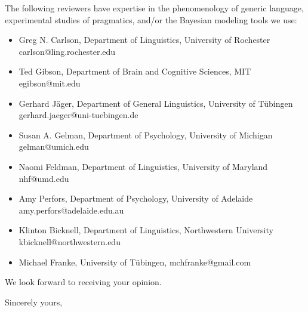 \documentclass[11pt,letterpaper]{letter} %
\begin{document}
\begin{letter}


%



The following reviewers have expertise in the phenomenology of generic language, experimental studies of pragmatics, and/or the Bayesian modeling tools we use:

\begin{itemize}
\item Greg N. Carlson, Department of Linguistics, University of Rochester carlson@ling.rochester.edu
\item Ted Gibson, Department of Brain and Cognitive Sciences, MIT egibson@mit.edu
\item Gerhard J{\"a}ger, Department of General Linguistics, University of T{\"u}bingen gerhard.jaeger@uni-tuebingen.de
\item Susan A. Gelman, Department of Psychology, University of Michigan gelman@umich.edu
\item Naomi Feldman, Department of Linguistics, University of Maryland nhf@umd.edu
\item Amy Perfors, Department of Psychology, University of Adelaide amy.perfors@adelaide.edu.au
\item Klinton Bicknell, Department of Linguistics, Northwestern University kbicknell@northwestern.edu
\item Michael Franke, University of T{\"u}bingen, mchfranke@gmail.com
\end{itemize}

We look forward to receiving your opinion.


\closing{Sincerely yours,}


\end{letter}
\end{document}
